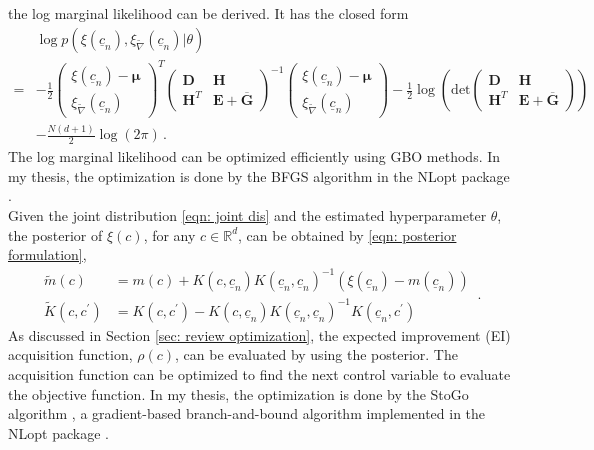 the log marginal likelihood can be derived. It has the closed form
\begin{equation}\begin{split}
    &\log p(\xi(\underline{c}_n), \xi_{\tilde{\nabla}}(\underline{c}_n) | \theta) \\ 
    =&
    - \frac{1}{2} 
    \begin{pmatrix}
        \xi(\underline{c}_n) - \boldsymbol{\mu}\\ \xi_{\tilde{\nabla}}(\underline{c}_n)
    \end{pmatrix}^T
    \begin{pmatrix}
        \boldsymbol{D}& \boldsymbol{H}\\
        \boldsymbol{H}^T & \boldsymbol{E}+\overline{\boldsymbol{G}}
    \end{pmatrix}^{-1}
    \begin{pmatrix}
        \xi(\underline{c}_n) -\boldsymbol{\mu}\\ \xi_{\tilde{\nabla}}(\underline{c}_n)
    \end{pmatrix}
    - \frac{1}{2}
    \log \left(\textrm{det}
        \begin{pmatrix}
            \boldsymbol{D}& \boldsymbol{H}\\
            \boldsymbol{H}^T & \boldsymbol{E}+\overline{\boldsymbol{G}}
        \end{pmatrix}       
    \right) \\
    &- \frac{N(d+1)}{2} \log(2\pi)\,.
\end{split}\label{eqn: likelihood eqn}
\end{equation}
The log marginal likelihood can be optimized efficiently using GBO methods. 
In my thesis, the optimization is done by the BFGS algorithm
in the NLopt package \cite{nlopt}.\\

Given the joint distribution
\eqref{eqn: joint dis} and the estimated hyperparameter $\theta$, 
the posterior of $\xi(c)$, for any $c\in \mathbb{R}^d$, 
can be obtained by \eqref{eqn: posterior formulation},
\begin{equation*}\begin{split}
    \tilde{m}(c) & 
    = m(c) + K(c,\underline{c}_n)K(\underline{c}_n,\underline{c}_n)^{-1}
    \left(\xi(\underline{c}_n) - m(\underline{c}_n)\right)\\
    \tilde{K}(c, c^\prime)&=
    K(c,c^\prime) - K(c,\underline{c}_n) K(\underline{c}_n, \underline{c}_n)^{-1} K(\underline{c}_n,c^\prime)
\end{split}\,.
\end{equation*}
As discussed in Section \ref{sec: review optimization},
the expected improvement (EI) acquisition function, $\rho(c)$, 
can be evaluated by using the posterior.
The acquisition function can be optimized
to find the next control variable to evaluate the objective function. 
In my thesis, the optimization is done by
the StoGo algorithm \cite{stogo 1, stogo 2}, a gradient-based branch-and-bound algorithm 
implemented in the NLopt package \cite{nlopt}.


